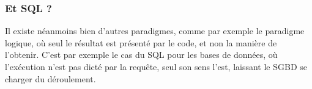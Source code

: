 \subsubsection{Et SQL ?}

	Il existe néanmoins bien d'autres paradigmes, comme par exemple le paradigme logique, où seul le résultat est présenté par le code, et non la manière de l'obtenir. C'est par exemple le cas du SQL pour les bases de données, où l'exécution n'est pas dicté par la requête, seul son sens l'est, laissant le SGBD se charger du déroulement.